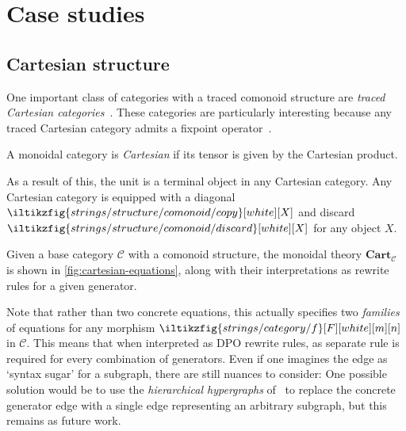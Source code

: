 \section{Case studies}

\subsection{Cartesian structure}

One important class of categories with a traced comonoid structure are
\emph{traced Cartesian categories}~\cite{cazanescu1990new,hasegawa1997recursion}.
These categories are particularly interesting because any traced Cartesian
category admits a fixpoint operator~\cite[Thm. 3.1]{hasegawa1997recursion}.

\begin{definition}
    A monoidal category is \emph{Cartesian} if its tensor is given by the
    Cartesian product.
\end{definition}

As a result of this, the unit is a terminal object in any Cartesian category.
Any Cartesian category is equipped with a diagonal \(
    \iltikzfig{strings/structure/comonoid/copy}[white][X]
\) and discard \(
    \iltikzfig{strings/structure/comonoid/discard}[white][X]
\) for any object \(X\).


Given a base category \(\mathcal{C}\) with a comonoid structure, the monoidal
theory \(\mathbf{Cart}_\mathcal{C}\) is shown in \cref{fig:cartesian-equations},
along with their interpretations as rewrite rules for a given generator.

\begin{remark}
    Note that rather than two concrete equations, this actually specifies two
    \emph{families} of equations for any morphism \(
        \iltikzfig{strings/category/f}[F][white][m][n]
    \) in \(\mathcal{C}\).
    This means that when interpreted as DPO rewrite rules, as separate rule is
    required for every combination of generators.
    Even if one imagines the edge as `syntax sugar' for a subgraph, there are
    still nuances to consider:
    One possible solution would be to use the \emph{hierarchical hypergraphs}
    of~\cite{alvarez-picallo2022rewriting} to replace the concrete generator edge
    with a single edge representing an arbitrary subgraph, but this remains as
    future work.
\end{remark}



